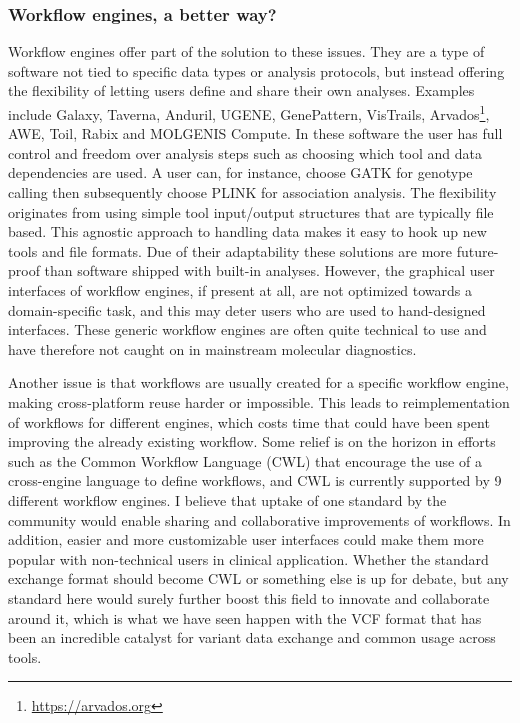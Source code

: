 \subsubsection*{Workflow engines, a better way?}

Workflow engines offer part of the solution to these issues.
They are a type of software not tied to specific data types or analysis protocols, but instead offering the flexibility of letting users define and share their own analyses.
Examples include Ga\-la\-xy\cite{Goecks_2010}, Ta\-ver\-na\cite{Wolstencroft_2013}, An\-du\-ril\cite{Ovaska_2010}, UGENE\cite{Okonechnikov_2012}, Gene\-Pat\-tern\cite{Reich_2006}, Vis\-Trails\cite{Bavoil_2005}, Ar\-va\-dos\footnote{\url{https://arvados.org}}, AWE, Toil, Ra\-bix and MOL\-GEN\-IS Compute\cite{Byelas_2013}.
In these software the user has full control and freedom over analysis steps such as choosing which tool and data dependencies are used. 
A user can, for instance, choose GATK\cite{Van_der_Auwera_2013} for genotype calling then subsequently choose PLI\-NK\cite{Purcell_2007} for association analysis.
The flexibility originates from using simple tool input/output structures that are typically file based.
This agnostic approach to handling data makes it easy to hook up new tools and file formats.
Due of their adaptability these solutions are more future-proof than software shipped with built-in analyses.
However, the graphical user interfaces of workflow engines, if present at all, are not optimized towards a domain-specific task, and this may deter users who are used to hand-designed interfaces.
These generic workflow engines are often quite technical to use and have therefore not caught on in mainstream molecular diagnostics.

Another issue is that workflows are usually created for a specific workflow engine, making cross-platform reuse harder or impossible.
This leads to reimplementation of workflows for different engines, which costs time that could have been spent improving the already existing workflow.
Some relief is on the horizon in efforts such as the Common Workflow Language\cite{Amstutz2016} (CWL) that encourage the use of a cross-engine language to define workflows, and CWL is currently supported by 9 different workflow engines.
I believe that uptake of one standard by the community would enable sharing and collaborative improvements of workflows.
In addition, easier and more customizable user interfaces could make them more popular with non-technical users in clinical application.
Whether the standard exchange format should become CWL or something else is up for debate, but any standard here would surely further boost this field to innovate and collaborate around it, which is what we have seen happen with the VCF format that has been an incredible catalyst for variant data exchange and common usage across tools.

